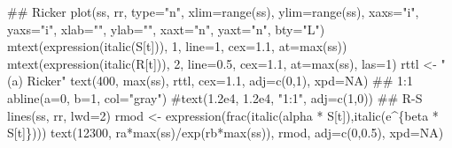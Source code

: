\documentclass[
  11pt,
]{article}
\newenvironment{Shaded}{}{}
\newcommand{\AttributeTok}[1]{#1}
\newcommand{\CommentTok}[1]{\textcolor[rgb]{0.00,0.50,0.00}{#1}}
\newcommand{\ConstantTok}[1]{#1}
\newcommand{\DecValTok}[1]{#1}
\newcommand{\DocumentationTok}[1]{\textcolor[rgb]{0.00,0.50,0.00}{#1}}
\newcommand{\FloatTok}[1]{#1}
\newcommand{\FunctionTok}[1]{#1}
\newcommand{\NormalTok}[1]{#1}
\newcommand{\OtherTok}[1]{\textcolor[rgb]{1.00,0.25,0.00}{#1}}
\newcommand{\SpecialCharTok}[1]{\textcolor[rgb]{0.00,0.50,0.50}{#1}}
\newcommand{\StringTok}[1]{\textcolor[rgb]{0.00,0.50,0.50}{#1}}
\begin{document}
\begin{Shaded}
\begin{Highlighting}[]
\DocumentationTok{\#\# Ricker}
\FunctionTok{plot}\NormalTok{(ss, rr, }\AttributeTok{type=}\StringTok{"n"}\NormalTok{, }\AttributeTok{xlim=}\FunctionTok{range}\NormalTok{(ss), }\AttributeTok{ylim=}\FunctionTok{range}\NormalTok{(ss), }\AttributeTok{xaxs=}\StringTok{"i"}\NormalTok{, }\AttributeTok{yaxs=}\StringTok{"i"}\NormalTok{,}
     \AttributeTok{xlab=}\StringTok{""}\NormalTok{, }\AttributeTok{ylab=}\StringTok{""}\NormalTok{, }\AttributeTok{xaxt=}\StringTok{"n"}\NormalTok{, }\AttributeTok{yaxt=}\StringTok{"n"}\NormalTok{, }\AttributeTok{bty=}\StringTok{"L"}\NormalTok{)}
\FunctionTok{mtext}\NormalTok{(}\FunctionTok{expression}\NormalTok{(}\FunctionTok{italic}\NormalTok{(S[t])), }\DecValTok{1}\NormalTok{, }\AttributeTok{line=}\DecValTok{1}\NormalTok{, }\AttributeTok{cex=}\FloatTok{1.1}\NormalTok{, }\AttributeTok{at=}\FunctionTok{max}\NormalTok{(ss))}
\FunctionTok{mtext}\NormalTok{(}\FunctionTok{expression}\NormalTok{(}\FunctionTok{italic}\NormalTok{(R[t])), }\DecValTok{2}\NormalTok{, }\AttributeTok{line=}\FloatTok{0.5}\NormalTok{, }\AttributeTok{cex=}\FloatTok{1.1}\NormalTok{, }\AttributeTok{at=}\FunctionTok{max}\NormalTok{(ss), }\AttributeTok{las=}\DecValTok{1}\NormalTok{)}
\NormalTok{rttl }\OtherTok{\textless{}{-}} \StringTok{"(a) Ricker"}
\FunctionTok{text}\NormalTok{(}\DecValTok{400}\NormalTok{, }\FunctionTok{max}\NormalTok{(ss), rttl, }\AttributeTok{cex=}\FloatTok{1.1}\NormalTok{, }\AttributeTok{adj=}\FunctionTok{c}\NormalTok{(}\DecValTok{0}\NormalTok{,}\DecValTok{1}\NormalTok{), }\AttributeTok{xpd=}\ConstantTok{NA}\NormalTok{)}
\DocumentationTok{\#\# 1:1}
\FunctionTok{abline}\NormalTok{(}\AttributeTok{a=}\DecValTok{0}\NormalTok{, }\AttributeTok{b=}\DecValTok{1}\NormalTok{, }\AttributeTok{col=}\StringTok{"gray"}\NormalTok{)}
\CommentTok{\#text(1.2e4, 1.2e4, "1:1", adj=c(1,0))}
\DocumentationTok{\#\# R{-}S}
\FunctionTok{lines}\NormalTok{(ss, rr, }\AttributeTok{lwd=}\DecValTok{2}\NormalTok{)}
\NormalTok{rmod }\OtherTok{\textless{}{-}} \FunctionTok{expression}\NormalTok{(}\FunctionTok{frac}\NormalTok{(}\FunctionTok{italic}\NormalTok{(alpha }\SpecialCharTok{*}\NormalTok{ S[t]),}\FunctionTok{italic}\NormalTok{(e}\SpecialCharTok{\^{}}\NormalTok{\{beta }\SpecialCharTok{*}\NormalTok{ S[t]\})))}
\FunctionTok{text}\NormalTok{(}\DecValTok{12300}\NormalTok{, ra}\SpecialCharTok{*}\FunctionTok{max}\NormalTok{(ss)}\SpecialCharTok{/}\FunctionTok{exp}\NormalTok{(rb}\SpecialCharTok{*}\FunctionTok{max}\NormalTok{(ss)), rmod, }\AttributeTok{adj=}\FunctionTok{c}\NormalTok{(}\DecValTok{0}\NormalTok{,}\FloatTok{0.5}\NormalTok{), }\AttributeTok{xpd=}\ConstantTok{NA}\NormalTok{)}

\end{Highlighting}
\end{Shaded}
\end{document}

